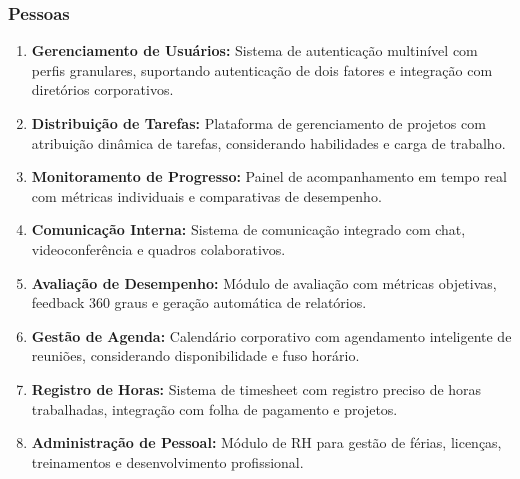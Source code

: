 \subsubsection{Pessoas}
\begin{enumerate}[leftmargin=*]
    \item \textbf{Gerenciamento de Usuários:} Sistema de autenticação multinível com perfis granulares, suportando autenticação de dois fatores e integração com diretórios corporativos.
    \item \textbf{Distribuição de Tarefas:} Plataforma de gerenciamento de projetos com atribuição dinâmica de tarefas, considerando habilidades e carga de trabalho.
    \item \textbf{Monitoramento de Progresso:} Painel de acompanhamento em tempo real com métricas individuais e comparativas de desempenho.
    \item \textbf{Comunicação Interna:} Sistema de comunicação integrado com chat, videoconferência e quadros colaborativos.
    \item \textbf{Avaliação de Desempenho:} Módulo de avaliação com métricas objetivas, feedback 360 graus e geração automática de relatórios.
    \item \textbf{Gestão de Agenda:} Calendário corporativo com agendamento inteligente de reuniões, considerando disponibilidade e fuso horário.
    \item \textbf{Registro de Horas:} Sistema de timesheet com registro preciso de horas trabalhadas, integração com folha de pagamento e projetos.
    \item \textbf{Administração de Pessoal:} Módulo de RH para gestão de férias, licenças, treinamentos e desenvolvimento profissional.
\end{enumerate}

